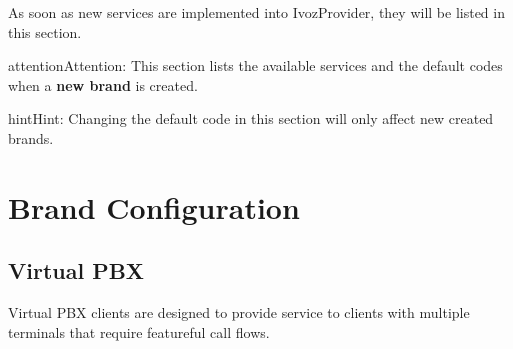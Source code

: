 \documentclass[letterpaper,10pt,english]{sphinxmanual}
\begin{document}
As soon as new services are implemented into IvozProvider, they will be listed
in this section.

\begin{notice}{attention}{Attention:}
This section lists the available services and the default codes
when a \textbf{new brand} is created.
\end{notice}

\begin{notice}{hint}{Hint:}
Changing the default code in this section will only affect new
created brands.
\end{notice}


\chapter{Brand Configuration}
\label{brand/index::doc}\label{brand/index:brand-configuration}

\section{Virtual PBX}
\label{brand/virtual_pbx::doc}\label{brand/virtual_pbx:virtual-pbx}
Virtual PBX clients are designed to provide service to clients with multiple terminals
that require featureful call flows.
\end{document}
